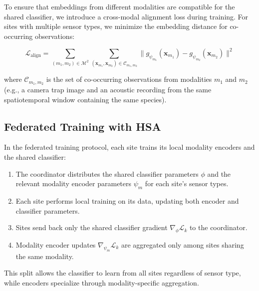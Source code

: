 To ensure that embeddings from different modalities are compatible for the shared classifier, we introduce a cross-modal alignment loss during training.
For sites with multiple sensor types, we minimize the embedding distance for co-occurring observations:

\begin{equation}
    \mathcal{L}_{\text{align}} = \sum_{(m_1, m_2) \in \mathcal{M}^2} \sum_{(\mathbf{x}_{m_1}, \mathbf{x}_{m_2}) \in \mathcal{C}_{m_1, m_2}} \|g_{\psi_{m_1}}(\mathbf{x}_{m_1}) - g_{\psi_{m_2}}(\mathbf{x}_{m_2})\|^2
\end{equation}

\noindent where $\mathcal{C}_{m_1, m_2}$ is the set of co-occurring observations from modalities $m_1$ and $m_2$ (e.g., a camera trap image and an acoustic recording from the same spatiotemporal window containing the same species).

\subsection{Federated Training with HSA}

In the federated training protocol, each site trains its local modality encoders and the shared classifier:

\begin{enumerate}[leftmargin=*]
    \item The coordinator distributes the shared classifier parameters $\phi$ and the relevant modality encoder parameters $\psi_m$ for each site's sensor types.
    \item Each site performs local training on its data, updating both encoder and classifier parameters.
    \item Sites send back only the shared classifier gradient $\nabla_\phi \mathcal{L}_k$ to the coordinator.
    \item Modality encoder updates $\nabla_{\psi_m} \mathcal{L}_k$ are aggregated only among sites sharing the same modality.
\end{enumerate}

This split allows the classifier to learn from all sites regardless of sensor type, while encoders specialize through modality-specific aggregation.

